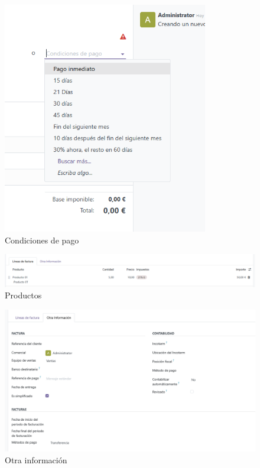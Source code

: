 \documentclass[a4paper,12pt]{article}
\begin{document}
\begin{figure}[h!]
    \centering
    \includegraphics[width=0.8\textwidth]{pr2odoo05-facturac03.png}
    \caption{Condiciones de pago}
\end{figure}
\FloatBarrier

\begin{figure}[h!]
    \centering
    \includegraphics[width=1.2\textwidth]{pr2odoo06-facturac04.png}
    \caption{Productos}
\end{figure}
\FloatBarrier

\begin{figure}[h!]
    \centering
    \includegraphics[width=1\textwidth]{pr2odoo07-facturac05.png}
    \caption{Otra información}
\end{figure}
\FloatBarrier
\end{document}
